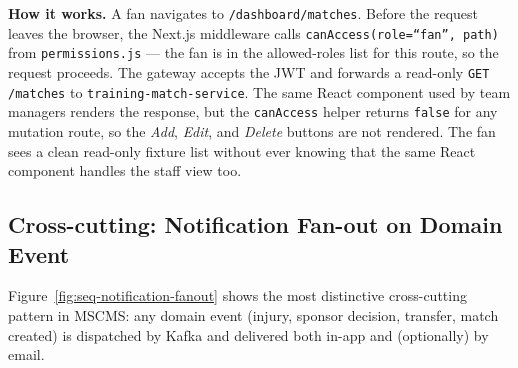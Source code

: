 \documentclass[12pt,a4paper,oneside]{report}
\begin{document}
\textbf{How it works.} A fan navigates to
\texttt{/dashboard/matches}. Before the request leaves the browser,
the Next.js middleware calls
\texttt{canAccess(role=\textquotedblleft fan\textquotedblright, path)}
from \texttt{permissions.js} --- the fan is in the allowed-roles list
for this route, so the request proceeds. The gateway accepts the JWT
and forwards a read-only \texttt{GET /matches} to
\texttt{training-match-service}. The same React component used by
team managers renders the response, but the \texttt{canAccess} helper
returns \texttt{false} for any mutation route, so the \emph{Add},
\emph{Edit}, and \emph{Delete} buttons are not rendered. The fan
sees a clean read-only fixture list without ever knowing that the
same React component handles the staff view too.

\subsection*{Cross-cutting: Notification Fan-out on Domain Event}
Figure~\ref{fig:seq-notification-fanout} shows the most distinctive
cross-cutting pattern in MSCMS: any domain event (injury, sponsor
decision, transfer, match created) is dispatched by Kafka and
delivered both in-app and (optionally) by email.
\end{document}
